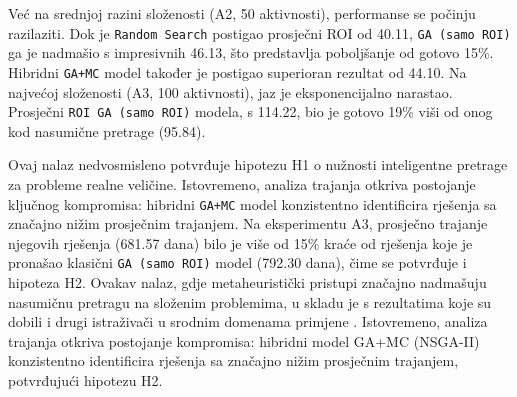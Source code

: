 Već na srednjoj razini složenosti (A2, 50 aktivnosti), performanse se počinju razilaziti. Dok je \texttt{Random Search} postigao prosječni ROI od 40.11, \texttt{GA (samo ROI)} ga je nadmašio s impresivnih 46.13, što predstavlja poboljšanje od gotovo 15\%. Hibridni \texttt{GA+MC} model također je postigao superioran rezultat od 44.10. Na najvećoj složenosti (A3, 100 aktivnosti), jaz je eksponencijalno narastao. Prosječni \texttt{ROI GA (samo ROI)} modela, s 114.22, bio je gotovo 19\% viši od onog kod nasumične pretrage (95.84).

Ovaj nalaz nedvosmisleno potvrđuje hipotezu H1 o nužnosti inteligentne pretrage za probleme realne veličine. Istovremeno, analiza trajanja otkriva postojanje ključnog kompromisa: hibridni \texttt{GA+MC} model konzistentno identificira rješenja sa značajno nižim prosječnim trajanjem. Na eksperimentu A3, prosječno trajanje njegovih rješenja (681.57 dana) bilo je više od 15\% kraće od rješenja koje je pronašao klasični \texttt{GA (samo ROI)} model (792.30 dana), čime se potvrđuje i hipoteza H2.
Ovakav nalaz, gdje metaheuristički pristupi značajno nadmašuju nasumičnu pretragu na složenim problemima, u skladu je s rezultatima koje su dobili i drugi istraživači u srodnim domenama primjene \cite{Gandomi2013}. Istovremeno, analiza trajanja otkriva postojanje kompromisa: hibridni model GA+MC (NSGA-II) konzistentno identificira rješenja sa značajno nižim prosječnim trajanjem, potvrđujući hipotezu H2.

